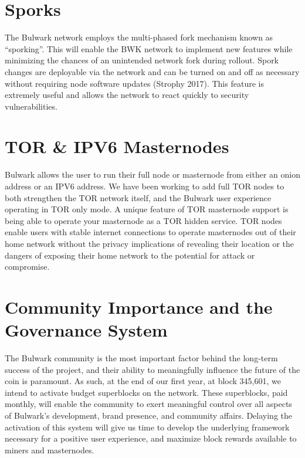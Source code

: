 \documentclass[11pt,a4paperpaper,]{report}
\begin{document}
\section{Sporks}\label{sporks}

The Bulwark network employs the multi-phased fork mechanism known as
``sporking''. This will enable the BWK network to implement new features
while minimizing the chances of an unintended network fork during
rollout. Spork changes are deployable via the network and can be turned
on and off as necessary without requiring node software updates (Strophy
2017). This feature is extremely useful and allows the network to react
quickly to security vulnerabilities.

\section{TOR \& IPV6 Masternodes}\label{tor-ipv6-masternodes}

Bulwark allows the user to run their full node or masternode from either
an onion address or an IPV6 address. We have been working to add full
TOR nodes to both strengthen the TOR network itself, and the Bulwark
user experience operating in TOR only mode. A unique feature of TOR
masternode support is being able to operate your masternode as a TOR
hidden service. TOR nodes enable users with stable internet connections
to operate masternodes out of their home network without the privacy
implications of revealing their location or the dangers of exposing
their home network to the potential for attack or compromise.

\section{Community Importance and the Governance
System}\label{community-importance-and-the-governance-system}

The Bulwark community is the most important factor behind the long-term
success of the project, and their ability to meaningfully influence the
future of the coin is paramount. As such, at the end of our first year,
at block 345,601, we intend to activate budget superblocks on the
network. These superblocks, paid monthly, will enable the community to
exert meaningful control over all aspects of Bulwark's development,
brand presence, and community affairs. Delaying the activation of this
system will give us time to develop the underlying framework necessary
for a positive user experience, and maximize block rewards available to
miners and masternodes.
\end{document}
